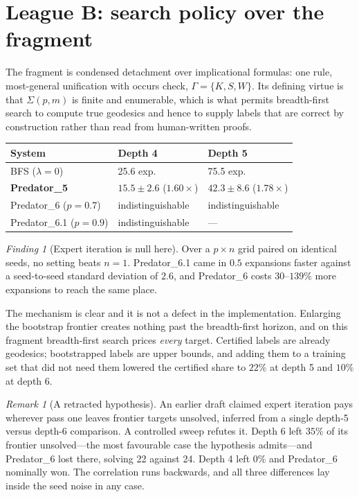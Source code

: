 \documentclass[11pt]{article}
\theoremstyle{plain}
\theoremstyle{definition}
\theoremstyle{remark}
\newtheorem{remark}[theorem]{Remark}
\newtheorem{finding}{Finding}
\newcommand{\Sig}{\Sigma}
\begin{document}
\section{League B: search policy over the fragment}

The fragment is condensed detachment over implicational formulas: one rule,
most-general unification with occurs check, $\Gamma = \{K,S,W\}$. Its defining
virtue is that $\Sig(p,m)$ is finite and enumerable, which is what permits
breadth-first search to compute true geodesics and hence to supply labels that
are correct by construction rather than read from human-written proofs.

\begin{center}
\small
\begin{tabular}{lll}
\toprule
\textbf{System} & \textbf{Depth 4} & \textbf{Depth 5} \\
\midrule
BFS ($\lambda = 0$) & 25.6 exp. & 75.5 exp. \\
\textbf{Predator\_5} & $\mathbf{15.5 \pm 2.6}$ ($1.60\times$) &
$\mathbf{42.3 \pm 8.6}$ ($1.78\times$) \\
Predator\_6 ($p=0.7$) & indistinguishable & indistinguishable \\
Predator\_6.1 ($p=0.9$) & indistinguishable & --- \\
\bottomrule
\end{tabular}
\end{center}

\begin{finding}[Expert iteration is null here]
Over a $p \times n$ grid paired on identical seeds, no setting beats $n=1$.
Predator\_6.1 came in $0.5$ expansions faster against a seed-to-seed standard
deviation of $2.6$, and Predator\_6 costs $30$--$139\%$ more expansions to reach
the same place.
\end{finding}

The mechanism is clear and it is not a defect in the implementation. Enlarging
the bootstrap frontier creates nothing past the breadth-first horizon, and on
this fragment breadth-first search prices \emph{every} target. Certified labels
are already geodesics; bootstrapped labels are upper bounds, and adding them to
a training set that did not need them lowered the certified share to $22\%$ at
depth 5 and $10\%$ at depth 6.

\begin{remark}[A retracted hypothesis]
An earlier draft claimed expert iteration pays wherever pass one leaves frontier
targets unsolved, inferred from a single depth-5 versus depth-6 comparison. A
controlled sweep refutes it. Depth 6 left $35\%$ of its frontier unsolved---the
most favourable case the hypothesis admits---and Predator\_6 lost there, solving
22 against 24. Depth 4 left $0\%$ and Predator\_6 nominally won. The correlation
runs backwards, and all three differences lay inside the seed noise in any case.
\end{remark}
\end{document}
